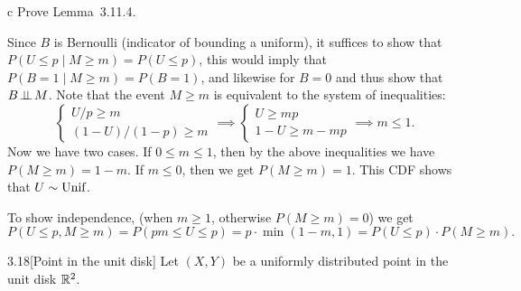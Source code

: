 \documentclass{pset}
\begin{document}
\begin{parts}
  \begin{part}{c}
    Prove Lemma~3.11.4. %
  \end{part}

  Since $B$ is Bernoulli (indicator of bounding a uniform), it suffices to show that $P(U \leq p \;|\; M \geq m) = P(U\leq p)$, this would imply that $P(B = 1 \;|\; M\geq m) = P(B=1)$, and likewise for $B=0$ and thus show that $B\!\perp\!\!\!\perp\! M$. Note that the event $M\geq m$ is equivalent to the system of inequalities:
  \[
    \begin{cases} U / p \geq m\\ (1-U) / (1-p) \geq m\end{cases} \implies \begin{cases} U \geq mp\\ 1-U \geq m-mp\end{cases} \implies m\leq 1.
  \]
  Now we have two cases. If $0\leq m \leq 1$, then by the above inequalities we have $P(M\geq m) = 1-m$. If $m \leq 0$, then we get $P(M\geq m) = 1$. This CDF shows that $U\sim \textrm{Unif}$.

  To show independence, (when $m\geq 1$, otherwise $P(M\geq m)=0$) we get
  \[P(U\leq p, M \geq m) = P(pm \leq U \leq p) = p\cdot \min(1-m, 1) = P(U\leq p)\cdot P(M\geq m).\]
\end{parts}

\begin{problem}{3.18}[Point in the unit disk]
  Let $(X,Y)$ be a uniformly distributed point in the unit disk $\mathbb{R}^2$.
\end{problem}
\end{document}
